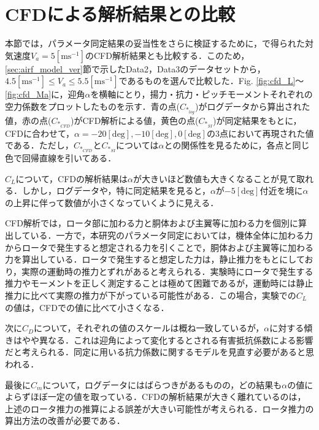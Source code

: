 \section{CFDによる解析結果との比較}
\label{sec:cfd}

本節では，パラメータ同定結果の妥当性をさらに検証するために，\cite{kawano}で得られた対気速度$V_a=5\mathrm{[m s^{-1}]}$のCFD解析結果とも比較する．このため，\ref{sec:airf_model_ver}節で示したData2，Data3のデータセットから，$4.5\mathrm{[m s^{-1}]} \leq V_a \leq 5.5\mathrm{[m s^{-1}]}$であるものを選んで比較した．Fig. \ref{fig:cfd_L}〜\ref{fig:cfd_Ma}に，迎角$\alpha$を横軸にとり，揚力・抗力・ピッチモーメントそれぞれの空力係数をプロットしたものを示す．青の点($C_{*_{log}}$)がログデータから算出された値，赤の点($C_{*_{CFD}}$)がCFD解析による値，黄色の点($C_{*_{SI}}$)が同定結果をもとに，CFDに合わせて，$\alpha=-20\mathrm{[deg]},-10\mathrm{[deg]},0\mathrm{[deg]}$の3点において再現された値である．ただし，$C_{*_{CFD}}$と$C_{*_{SI}}$については$\alpha$との関係性を見るために，各点と同じ色で回帰直線を引いてある．

$C_L$について，CFDの解析結果は$\alpha$が大きいほど数値も大きくなることが見て取れる．しかし，ログデータや，特に同定結果を見ると，$\alpha$が$-5\mathrm{[deg]}$付近を境に$\alpha$の上昇に伴って数値が小さくなっていくように見える．

CFD解析では，ロータ部に加わる力と胴体および主翼等に加わる力を個別に算出している．一方で，本研究のパラメータ同定においては，機体全体に加わる力からロータで発生すると想定される力を引くことで，胴体および主翼等に加わる力を算出している．ロータで発生すると想定した力は，静止推力をもとにしており，実際の運動時の推力とずれがあると考えられる．実験時にロータで発生する推力やモーメントを正しく測定することは極めて困難であるが，運動時には静止推力に比べて実際の推力が下がっている可能性がある．この場合，実験での$C_L$の値は，CFDでの値に比べて小さくなる．

次に$C_D$について，それぞれの値のスケールは概ね一致しているが，$\alpha$に対する傾きはやや異なる．これは迎角によって変化するとされる有害抵抗係数による影響だと考えられる\cite{katou}．同定に用いる抗力係数に関するモデルを見直す必要があると思われる．

最後に$C_m$について，ログデータにはばらつきがあるものの，どの結果も$\alpha$の値によらずほぼ一定の値を取っている．CFDの解析結果が大きく離れているのは，上述のロータ推力の推算による誤差が大きい可能性が考えられる．ロータ推力の算出方法の改善が必要である．

